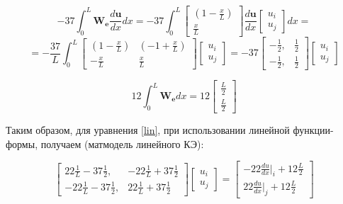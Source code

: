 $$
 -37  \int_0^L \mathbf{W_e} \frac{d \mathbf{u}}{dx} dx= -37  \int_0^L
	\begin{bmatrix}
	(1-\frac{x}{L}) \\
	\frac{x}{L}
	\end{bmatrix}
\frac{d \mathbf{u}}{dx}
	\begin{bmatrix}
	u_i \\
	u_j
	\end{bmatrix}
dx
=
$$
$$
= -\frac{ 37 }{L}  
\int_0^L
\begin{bmatrix}
	(1-\frac{x}{L}) & (-1+\frac{x}{L})\\
	-\frac{x}{L} & \frac{x}{L}
\end{bmatrix}
\begin{bmatrix}
	u_i \\
	u_j
\end{bmatrix}
=
 -37  
\begin{bmatrix}
-\frac{1}{2}, & \frac{1}{2} \\
-\frac{1}{2}, & \frac{1}{2}
\end{bmatrix}
\begin{bmatrix}
u_i \\
u_j
\end{bmatrix}
$$





$$
12\int_0^L \mathbf{W_e} d x= 12
\begin{bmatrix}
	\frac{L}{2} \\
	\frac{L}{2}
\end{bmatrix}
$$


Таким образом, для уравнения \ref{lin}, при использовании линейной функции-формы,  получаем (матмодель линейного КЭ):

$$
\begin{bmatrix}
	22\frac{1}{L}  -37 \frac{1}{2}    , &   -22 \frac{1}{L}  +37 \frac{1}{2}     \\
	  -22  \frac{1}{L}  -37 \frac{1}{2}    , &  22\frac{1}{L}  +37 \frac{1}{2}    
\end{bmatrix}
\begin{bmatrix}
	u_i \\
	u_j
\end{bmatrix}=
\begin{bmatrix}
	  -22 \frac{du}{dx}|_i   +12 \frac{L}{2} \\
	22\frac{du}{dx}|_j   +12 \frac{L}{2} 
\end{bmatrix}
$$


